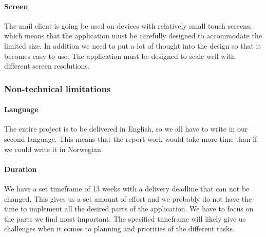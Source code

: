 \paragraph{Screen}\hfill
\newline
The mail client is going be used on devices with relatively small touch screens, which means that the application must be carefully designed to accommodate the limited size. In addition we need to put a lot of thought into the design so that it becomes easy to use. The application must be designed to scale well with different screen resolutions.

\subsubsection{Non-technical limitations}

\paragraph{Language}\hfill
\newline
The entire project is to be delivered in English, so we all have to write in our second language. This means that the report work would take more time than if we could write it in Norwegian. 

\paragraph{Duration}\hfill
\newline
We have a set timeframe of 13 weeks with a delivery deadline that can not be changed. This gives us a set amount of effort and we probably do not have the time to implement all the desired parts of the application. We have to focus on the parts we find most important. The specified timeframe will likely give us challenges when it comes to planning and priorities of the different tasks.